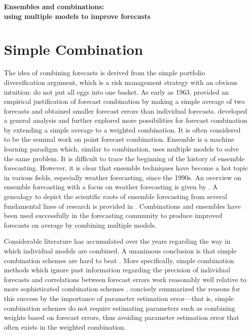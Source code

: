 \documentclass[11pt]{article}
\begin{document}
\def\spacingset#1{\renewcommand{\baselinestretch}%
{#1}\small\normalsize} \spacingset{1}

\begin{center}
{\bf\Large Ensembles and combinations: \\using multiple models to improve forecasts}
\end{center}


\bigskip


\spacingset{1.5} 

\section{Simple Combination}

The idea of combining forecasts is derived from the simple portfolio diversification argument, which is a risk management strategy with an obvious intuition: do not put all eggs into one basket. As early as 1963, \cite{Barnard1963-xa} provided an empirical justification of forecast combination by making a simple average of two forecasts and obtained smaller forecast errors than individual forecasts. \cite{Bates1969-yj} developed a general analysis and further explored more possibilities for forecast combination by extending a simple average to a weighted combination. It is often considered to be the seminal work on point forecast combination. Ensemble is a machine learning paradigm which, similar to combination, uses multiple models to solve the same problem. It is difficult to trace the beginning of the history of ensemble forecasting. However, it is clear that ensemble techniques have become a hot topic in various fields, especially weather forecasting, since the 1990s. An overview on ensemble forecasting with a focus on weather forecasting is given by \cite{Leutbecher2008-mc}. A genealogy to depict the scientific roots of ensemble forecasting from several fundamental lines of research is provided in \cite{Lewis2005-hu}. Combinations and ensembles have been used successfully in the forecasting community to produce improved forecasts on average by combining multiple models.

Considerable literature has accumulated over the years regarding the way in which individual models are combined. A unanimous conclusion is that simple combination schemes are hard to beat \citep{Clemen1989-fb,Stock2004-rq,Lichtendahl2020-ut}. More specifically, simple combination methods which ignore past information regarding the precision of individual forecasts and correlations between forecast errors work reasonably well relative to more sophisticated combination schemes \citep[see][]{Clemen1989-fb}. \cite{Timmermann2006-en} concisely summarized the reasons for this success by the importance of parameter estimation error---that is, simple combination schemes do not require estimating parameters such as combining weights based on forecast errors, thus avoiding parameter estimation error that often exists in the weighted combination.
\end{document}

